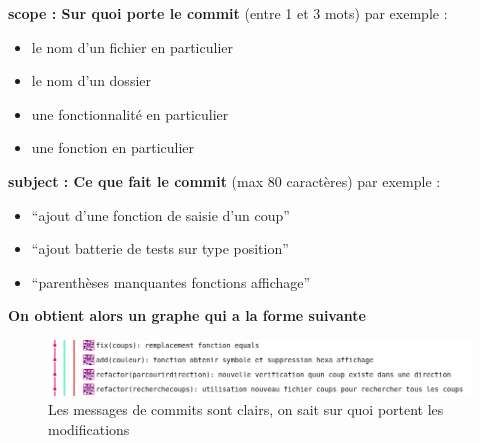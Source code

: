 \textbf{scope : Sur quoi porte le commit} (entre 1 et 3 mots) par exemple :
\begin{itemize}

  \item le nom d’un fichier en particulier
  \item le nom d’un dossier
  \item une fonctionnalité en particulier
  \item une fonction en particulier
\end{itemize}

\textbf{subject : Ce que fait le commit} (max 80 caractères) par exemple :
\begin{itemize}

  \item “ajout d’une fonction de saisie d’un coup”
  \item “ajout batterie de tests sur type position”
  \item “parenthèses manquantes fonctions affichage”
\end{itemize}

\begin{center}
\textbf{On obtient alors un graphe qui a la forme suivante}
\end{center}
\begin{figure}[h]
  \includegraphics[width=18cm]{./sourcesIMAGES/commits.png}
  \caption{Les messages de commits sont clairs, on sait sur quoi portent les modifications}
\end{figure}
